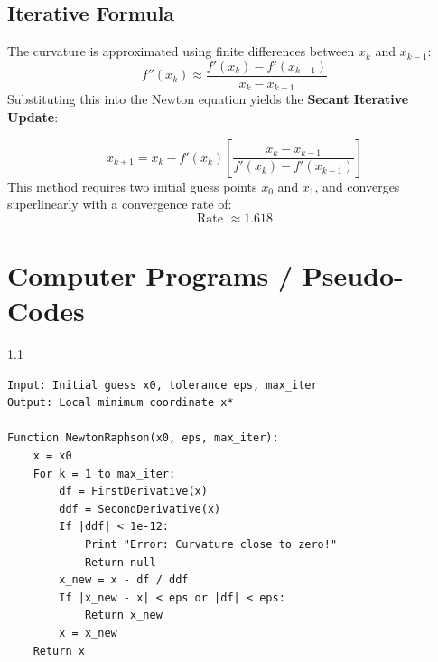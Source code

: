 \documentclass[12pt,a4paper]{article}
\begin{document}
\subsection{Iterative Formula}
The curvature is approximated using finite differences between $x_k$ and $x_{k-1}$:
\begin{equation}
  f''(x_k) \approx \frac{f'(x_k) - f'(x_{k-1})}{x_k - x_{k-1}}
\end{equation}
Substituting this into the Newton equation yields the \textbf{Secant Iterative Update}:

\begin{tcolorbox}[formulabox, title={Secant Method Equation}]
\begin{equation}
  x_{k+1} = x_k - f'(x_k) \left[ \frac{x_k - x_{k-1}}{f'(x_k) - f'(x_{k-1})} \right]
\end{equation}
This method requires two initial guess points $x_0$ and $x_1$, and converges superlinearly with a convergence rate of:
\begin{equation}
  \text{Rate } \approx 1.618
\end{equation}
\end{tcolorbox}

\section{Computer Programs / Pseudo-Codes}

\begin{tcolorbox}[tikzbox, title={Newton-Raphson Optimization Pseudo-code}]
\begin{spacing}{1.1}
\begin{verbatim}
Input: Initial guess x0, tolerance eps, max_iter
Output: Local minimum coordinate x*

Function NewtonRaphson(x0, eps, max_iter):
    x = x0
    For k = 1 to max_iter:
        df = FirstDerivative(x)
        ddf = SecondDerivative(x)
        If |ddf| < 1e-12: 
            Print "Error: Curvature close to zero!"
            Return null
        x_new = x - df / ddf
        If |x_new - x| < eps or |df| < eps:
            Return x_new
        x = x_new
    Return x
\end{verbatim}
\end{spacing}
\end{tcolorbox}
\end{document}
